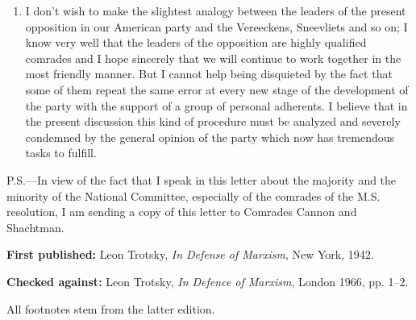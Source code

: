 \begin{enumerate}
  \item I don’t wish to make the slightest analogy between the leaders of the present opposition in our American party and the Vereeckens, Sneevliets and so on; I know very well that the leaders of the opposition are highly qualified comrades and I hope sincerely that we will continue to work together in the most friendly manner. But I cannot help being disquieted by the fact that some of them repeat the same error at every new stage of the development of the party with the support of a group of personal adherents. I believe that in the present discussion this kind of procedure must be analyzed and severely condemned by the general opinion of the party which now has tremendous tasks to fulfill.
	
\end{enumerate}

\newpage


\begin{postscriptum}
  P.S.---In view of the fact that I speak in this letter about the majority and the minority of the National Committee, especially of the comrades of the M.S. resolution, I am sending a copy of this letter to Comrades Cannon and Shachtman.
\end{postscriptum}

\begin{letterinfo}
  \textbf{First published:} Leon Trotsky, \emph{In Defense of Marxism}, New York, 1942.

  \textbf{Checked against:} Leon Trotsky, \emph{In Defence of Marxism}, London 1966, pp. 1--2.

  All footnotes stem from the latter edition.
\end{letterinfo}